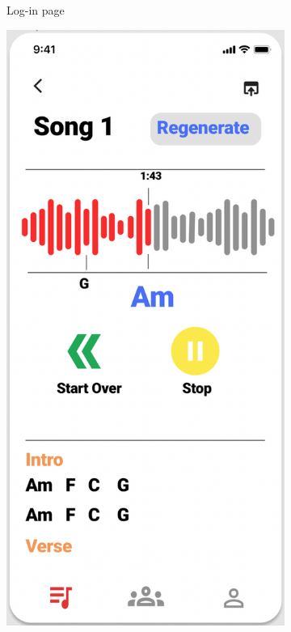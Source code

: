 \begin{figure}[ht]
\begin{subfigure}[b]{0.2\textwidth}
         \caption{Log-in page}
         \label{Log-in page}
     \end{subfigure}
     \hfill
     \begin{subfigure}[b]{0.2\textwidth}
         \centering
         \includegraphics[width=\textwidth]{Figures/grappp}

\end{subfigure}
\end{figure}
